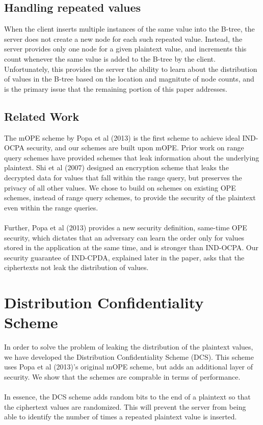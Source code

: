 \documentclass[12pt]{article}
\begin{document}
\subsection{Handling repeated values}
When the client inserts multiple instances of the same value into the B-tree, the server does not create a new node for each such repeated value. Instead, the server provides only one node for a given plaintext value, and increments this count whenever the same value is added to the B-tree by the client. Unfortunately, this provides the server the ability to learn about the distribution of values in the B-tree based on the location and magnitute of node counts, and is the primary issue that the remaining portion of this paper addresses. 
\subsection{Related Work}
The mOPE scheme by Popa et al (2013) is the first scheme to achieve ideal IND-OCPA security, and our schemes are built upon mOPE. Prior work on range query schemes have provided schemes that leak information about the underlying plaintext. Shi et al (2007) designed an encryption scheme that leaks the decrypted data for values that fall within the range query, but preserves the privacy of all other values. We chose to build on schemes on existing OPE schemes, instead of range query schemes, to provide the security of the plaintext even within the range queries. \\ \\
Further, Popa et al (2013) provides a new security definition, same-time OPE security, which dictates that an adversary can learn the order only for values stored in the application at the same time, and is stronger than IND-OCPA. Our security guarantee of IND-CPDA, explained later in the paper, asks that the ciphertexts not leak the distribution of values. 
\section{Distribution Confidentiality Scheme}
In order to solve the problem of leaking the distribution of the plaintext values, we have developed the Distribution Confidentiality Scheme (DCS). This scheme uses Popa et al (2013)'s original mOPE scheme, but adds an additional layer of security. We show that the schemes are comprable in terms of performance. \\ \\
In essence, the DCS scheme adds random bits to the end of a plaintext so that the ciphertext values are randomized. This will prevent the server from being able to identify the number of times a repeated plaintext value is inserted. \\ \\
\end{document}
